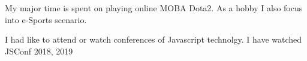 

\begin{cventries}

    {
      \begin{cvitems} %
        \item {My major time is spent on playing online MOBA Dota2. As a hobby I also focus into e-Sports scenario.}
        \item { I had like to attend or watch conferences of Javascript technolgy. I have watched JSConf 2018, 2019}
      \end{cvitems}
    }

\end{cventries}
